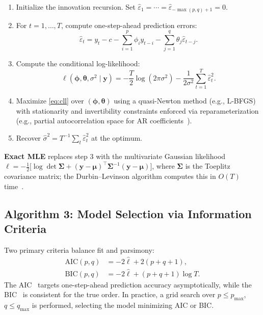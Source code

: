 \documentclass[conference]{IEEEtran}
\theoremstyle{definition}
\begin{document}
\begin{enumerate}
  \item Initialize the innovation recursion. Set $\hat{\varepsilon}_1 = \cdots
        = \hat{\varepsilon}_{-\max(p,q)+1} = 0$.
  \item For $t = 1, \ldots, T$, compute one-step-ahead prediction errors:
        \begin{equation}
          \hat{\varepsilon}_t = y_t - c - \sum_{i=1}^p \phi_i y_{t-i}
                                - \sum_{j=1}^q \theta_j \hat{\varepsilon}_{t-j}.
          \label{eq:innovations}
        \end{equation}
  \item Compute the conditional log-likelihood:
        \begin{equation}
          \ell(\boldsymbol{\phi},\boldsymbol{\theta},\sigma^2 \mid \mathbf{y})
          = -\frac{T}{2}\log(2\pi\sigma^2)
            - \frac{1}{2\sigma^2}\sum_{t=1}^T \hat{\varepsilon}_t^2.
          \label{eq:cll}
        \end{equation}
  \item Maximize \eqref{eq:cll} over $(\boldsymbol{\phi},\boldsymbol{\theta})$
        using a quasi-Newton method (e.g., L-BFGS) with stationarity and
        invertibility constraints enforced via reparameterization
        (e.g., partial autocorrelation space for AR coefficients~\cite{jones1980maximum}).
  \item Recover $\hat{\sigma}^2 = T^{-1}\sum_t \hat{\varepsilon}_t^2$ at
        the optimum.
\end{enumerate}

\textbf{Exact MLE} replaces step 3 with the multivariate Gaussian likelihood
$\ell = -\frac{1}{2}\bigl[\log\det\boldsymbol{\Sigma} +
(\mathbf{y}-\boldsymbol{\mu})^{\top}\boldsymbol{\Sigma}^{-1}(\mathbf{y}-\boldsymbol{\mu})\bigr]$,
where $\boldsymbol{\Sigma}$ is the Toeplitz covariance matrix;
the Durbin--Levinson algorithm computes this in $O(T)$ time~\cite{brockwell1991time}.

\subsection{Algorithm 3: Model Selection via Information Criteria}

Two primary criteria balance fit and parsimony:
\begin{align}
  \mathrm{AIC}(p,q) &= -2\hat{\ell} + 2(p+q+1), \label{eq:aic}\\
  \mathrm{BIC}(p,q) &= -2\hat{\ell} + (p+q+1)\log T. \label{eq:bic}
\end{align}
The AIC~\cite{akaike1974new} targets one-step-ahead prediction accuracy
asymptotically, while the BIC~\cite{schwarz1978estimating} is consistent
for the true order. In practice, a grid search over $p \leq p_{\max}$,
$q \leq q_{\max}$ is performed, selecting the model minimizing AIC or BIC.
\end{document}

